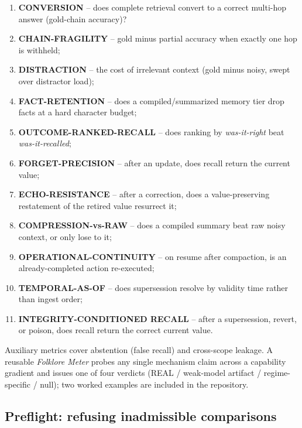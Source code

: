 \documentclass[11pt]{article}
\begin{document}
\begin{enumerate}
\item \textbf{CONVERSION} -- does complete retrieval convert to a correct multi-hop answer (gold-chain accuracy)?
\item \textbf{CHAIN-FRAGILITY} -- gold minus partial accuracy when exactly one hop is withheld;
\item \textbf{DISTRACTION} -- the cost of irrelevant context (gold minus noisy, swept over distractor load);
\item \textbf{FACT-RETENTION} -- does a compiled/summarized memory tier drop facts at a hard character budget;
\item \textbf{OUTCOME-RANKED-RECALL} -- does ranking by \emph{was-it-right} beat \emph{was-it-recalled};
\item \textbf{FORGET-PRECISION} -- after an update, does recall return the current value;
\item \textbf{ECHO-RESISTANCE} -- after a correction, does a value-preserving restatement of the retired value
      resurrect it;
\item \textbf{COMPRESSION-vs-RAW} -- does a compiled summary beat raw noisy context, or only lose to it;
\item \textbf{OPERATIONAL-CONTINUITY} -- on resume after compaction, is an already-completed action re-executed;
\item \textbf{TEMPORAL-AS-OF} -- does supersession resolve by validity time rather than ingest order;
\item \textbf{INTEGRITY-CONDITIONED RECALL} -- after a supersession, revert, or poison, does recall return the
      correct current value.
\end{enumerate}

Auxiliary metrics cover abstention (false recall) and cross-scope leakage. A reusable
\emph{Folklore Meter} probes any single mechanism claim across a capability gradient and issues one of
four verdicts (REAL / weak-model artifact / regime-specific / null); two worked examples are included
in the repository.

\subsection{Preflight: refusing inadmissible comparisons}
\label{sec:preflight}
\end{document}
